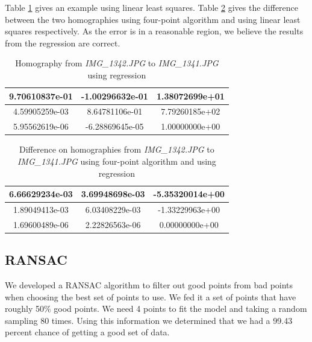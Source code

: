 \documentclass[paper=a4, fontsize=11pt]{scrartcl}
\begin{document}
Table \ref{tb:homograph:regression} gives an example using linear least squares.
Table \ref{tb:homograph:regression:error} gives the difference between the two homographies using four-point algorithm and using linear least squares respectively.
As the error is in a reasonable region, we believe the results from the regression are correct.

\begin{table}
\caption{Homography from \emph{IMG\_1342.JPG} to \emph{IMG\_1341.JPG} using regression}
\label{tb:homograph:regression}
\begin{center}
\begin{tabular}{|c|c|c|}
	\hline
	9.70610837e-01 & -1.00296632e-01 &  1.38072699e+01\\
	\hline
	4.59905259e-03 & 8.64781106e-01 &  7.79260185e+02\\
	\hline
	5.95562619e-06 & -6.28869645e-05 &  1.00000000e+00\\
	\hline
\end{tabular}
\end{center}
\end{table}

\begin{table}
\caption{Difference on homographies from \emph{IMG\_1342.JPG} to \emph{IMG\_1341.JPG} using four-point algorithm and using regression}
\label{tb:homograph:regression:error}
\begin{center}
\begin{tabular}{|c|c|c|}
	\hline
	6.66629234e-03 &  3.69948698e-03 & -5.35320014e+00\\
	\hline
	1.89049413e-03 &  6.03408229e-03 & -1.33229963e+00\\
	\hline
	1.69600489e-06 &  2.22826563e-06 &  0.00000000e+00\\
	\hline
\end{tabular}
\end{center}
\end{table}


\subsection{RANSAC}
We developed a RANSAC algorithm to filter out good points from bad points when choosing the best set of points to use.  We fed it a set of points that have roughly 50\% good points.  We need 4 points to fit the model and taking a random sampling 80 times.  Using this information we determined that we had a 99.43 percent chance of getting a good set of data.
\end{document}
